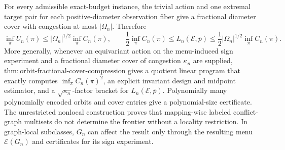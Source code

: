 For every admissible exact-budget instance, the trivial action and one extremal target pair for each positive-diameter observation fiber give a fractional diameter cover with congestion at most \(|\Omega_n|\). Therefore
\[
 \inf_\pi U_n(\pi)
 \le |\Omega_n|^{1/2}\inf_\pi C_n(\pi),
 \qquad
 \frac12\inf_\pi C_n(\pi)
 \le L_n(\mathcal E,\bar p)
 \le\frac12|\Omega_n|^{1/2}\inf_\pi C_n(\pi).
\]
More generally, whenever an equivariant action on the menu-induced sign experiment and a fractional diameter cover of congestion \(\kappa_n\) are supplied, \(\mathrm{thm{:}orbit\text{-}fractional\text{-}cover\text{-}compression}\) gives a quotient linear program that exactly computes \(\inf_\pi C_n(\pi)^2\), an explicit invariant design and midpoint estimator, and a \(\sqrt{\kappa_n}\)-factor bracket for \(L_n(\mathcal E,\bar p)\). Polynomially many polynomially encoded orbits and cover entries give a polynomial-size certificate. The unrestricted nonlocal construction proves that mapping-wise labeled conflict-graph multisets do not determine the frontier without a locality restriction. In graph-local subclasses, \(G_n\) can affect the result only through the resulting menu \(\mathcal E(G_n)\) and certificates for its sign experiment.